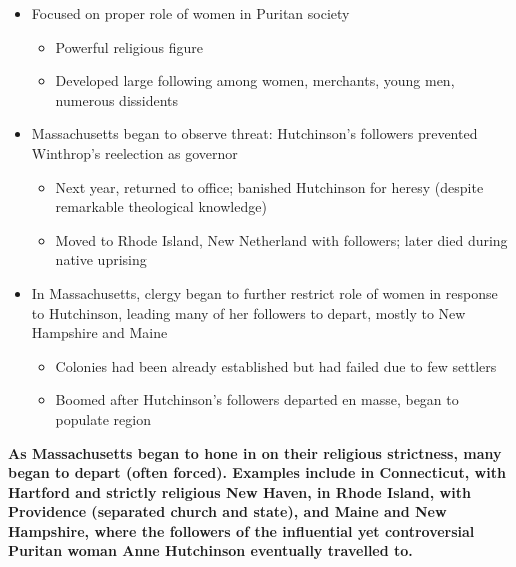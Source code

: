 \documentclass[a4paper]{article}
\begin{document}
{\begin{itemize}
\begin{itemize}
            \item Focused on proper role of women in Puritan society
            \begin{itemize}
                \item Powerful religious figure
                \item Developed large following among women, merchants, young men, numerous dissidents 
            \end{itemize}
            \item Massachusetts began to observe threat: Hutchinson's followers prevented Winthrop's reelection as governor
            \begin{itemize}
                \item Next year, returned to office; banished Hutchinson for heresy (despite remarkable theological knowledge)
                \item Moved to Rhode Island, New Netherland with followers; later died during native uprising
            \end{itemize}
            \item In Massachusetts, clergy began to further restrict role of women in response to Hutchinson, leading many of her followers to depart, mostly to New Hampshire and Maine
            \begin{itemize}
                \item Colonies had been already established but had failed due to few settlers
                \item Boomed after Hutchinson's followers departed en masse, began to populate region
            \end{itemize}
        \end{itemize}
    \end{itemize}
    \textbf{As Massachusetts began to hone in on their religious strictness, many began to depart (often forced). Examples include in Connecticut, with Hartford and strictly religious New Haven, in Rhode Island, with Providence (separated church and state), and Maine and New Hampshire, where the followers of the influential yet controversial Puritan woman Anne Hutchinson eventually travelled to.}}
\end{document}
